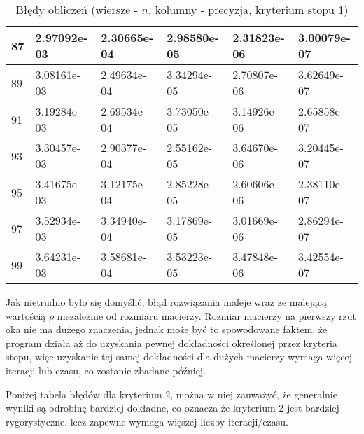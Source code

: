 \documentclass{article}
\begin{document}
\begin{table}[H]
\begin{tabular}{|l|l|l|l|l|l|}
87 & 2.97092e-03 & 2.30665e-04 & 2.98580e-05 & 2.31823e-06 & 3.00079e-07 \\ \hline
89 & 3.08161e-03 & 2.49634e-04 & 3.34294e-05 & 2.70807e-06 & 3.62649e-07 \\ \hline
91 & 3.19284e-03 & 2.69534e-04 & 3.73050e-05 & 3.14926e-06 & 2.65858e-07 \\ \hline
93 & 3.30457e-03 & 2.90377e-04 & 2.55162e-05 & 3.64670e-06 & 3.20445e-07 \\ \hline
95 & 3.41675e-03 & 3.12175e-04 & 2.85228e-05 & 2.60606e-06 & 2.38110e-07 \\ \hline
97 & 3.52934e-03 & 3.34940e-04 & 3.17869e-05 & 3.01669e-06 & 2.86294e-07 \\ \hline
99 & 3.64231e-03 & 3.58681e-04 & 3.53223e-05 & 3.47848e-06 & 3.42554e-07 \\ \hline
\end{tabular}
\caption{Błędy obliczeń (wiersze - $n$, kolumny - precyzja, kryterium stopu 1)}
\end{table}

Jak nietrudno było się domyślić, błąd rozwiązania maleje wraz ze malejącą wartością $\rho$ niezależnie od rozmiaru
macierzy. Rozmiar macierzy na pierwszy rzut oka nie ma dużego znaczenia, jednak może być to spowodowane faktem, że program
działa aż do uzyskania pewnej dokładności określonej przez kryteria stopu, więc uzyskanie tej samej dokładności dla 
dużych macierzy wymaga więcej iteracji lub czasu, co zostanie zbadane później.

Poniżej tabela błędów dla kryterium 2, można w niej zauważyć, że generalnie wyniki są odrobinę bardziej dokładne,
co oznacza że kryterium 2 jest bardziej rygorystyczne, lecz zapewne wymaga więszej liczby iteracji/czasu.

\newpage
\thispagestyle{empty}
\end{document}
